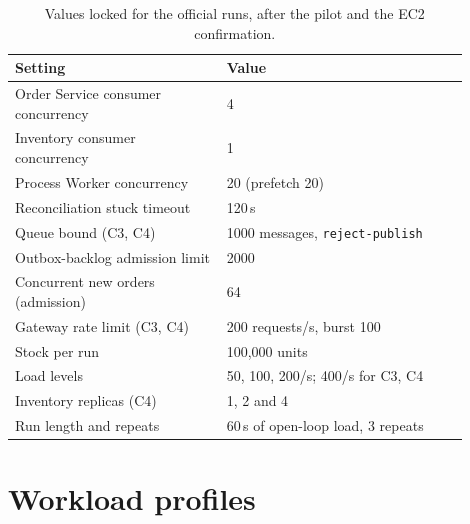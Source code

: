 \documentclass[a4paper]{report}
\begin{document}
\begin{table}[tbp]
\centering
\small
\caption{Values locked for the official runs, after the pilot and the EC2 confirmation.}
\label{tab:locked}
\begin{tabular}{@{}p{0.42\linewidth}p{0.48\linewidth}@{}}
\toprule
Setting & Value \\
\midrule
Order Service consumer concurrency & 4 \\
Inventory consumer concurrency & 1 \\
Process Worker concurrency & 20 (prefetch 20) \\
Reconciliation stuck timeout & 120\,s \\
Queue bound (C3, C4) & 1000 messages, \texttt{reject-publish} \\
Outbox-backlog admission limit & 2000 \\
Concurrent new orders (admission) & 64 \\
Gateway rate limit (C3, C4) & 200 requests/s, burst 100 \\
Stock per run & 100,000 units \\
Load levels & 50, 100, 200/s; 400/s for C3, C4 \\
Inventory replicas (C4) & 1, 2 and 4 \\
Run length and repeats & 60\,s of open-loop load, 3 repeats \\
\bottomrule
\end{tabular}
\end{table}

\section{Workload profiles}
\label{sec:profiles}
\end{document}

